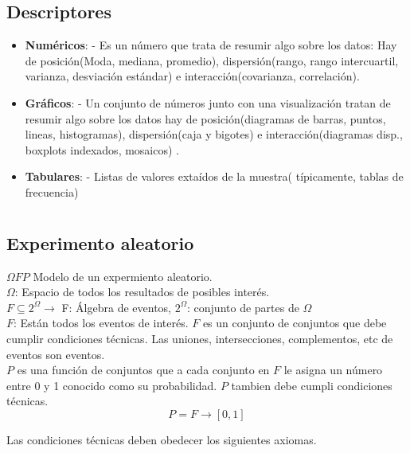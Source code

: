 \documentclass{report}
\begin{document}
\section{Descriptores}
\begin{itemize}

	\item {\textbf{Numéricos}:}
	      - Es un número que trata de resumir algo sobre los datos: Hay de posición(Moda, mediana, promedio), dispersión(rango, rango intercuartil, varianza, desviación estándar) e interacción(covarianza, correlación).
	\item {\textbf{Gráficos}:}
	      - Un conjunto de números junto con una visualización tratan de resumir algo sobre los datos hay de posición(diagramas de barras, puntos, lineas, histogramas), dispersión(caja y bigotes) e interacción(diagramas disp., boxplots indexados, mosaicos) .
	      \item{\textbf{Tabulares}:}
	      - Listas de valores extaídos de la muestra( típicamente, tablas de frecuencia)


\end{itemize}

\chapter{}

\section{Experimento aleatorio}

$\Omega F P$ Modelo de un expermiento aleatorio.\\
$\Omega$: Espacio de todos los resultados de posibles interés.\\
$F \subseteq 2^\Omega \rightarrow$ F: Álgebra de eventos, $2^\Omega$: conjunto de partes de $\Omega$\\
$F$: Están todos los eventos de interés. $F$ es un conjunto de conjuntos que debe cumplir condiciones técnicas. Las uniones, intersecciones, complementos, etc de eventos son eventos.\\
$P$ es una función de conjuntos que a cada conjunto en $F$ le asigna un número entre 0 y 1 conocido como su probabilidad. $P$ tambien debe cumpli condiciones técnicas.\\

\[
	P = F \rightarrow [0,1]
\]




Las condiciones técnicas deben obedecer los siguientes axiomas.
\end{document}
